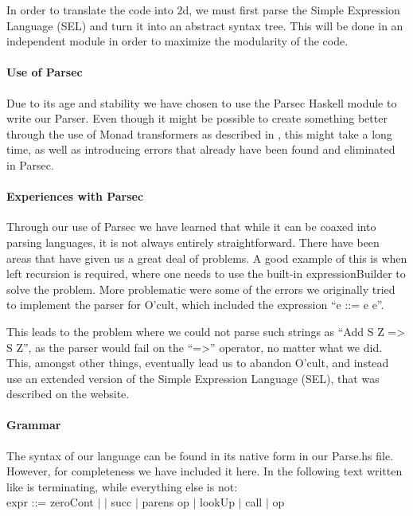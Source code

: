 \label{parser}
In order to translate the code into 2d, we must first parse the Simple
Expression Language (SEL) and turn it into an abstract syntax
tree. This will be done in an independent module in order to maximize
the modularity of the code.

\paragraph{Use of Parsec}
Due to its age and stability we have chosen to use the Parsec Haskell
module to write our Parser. Even though it might be possible to create
something better through the use of Monad transformers as described in
\cite{partial+parsing}, this might take a long time, as well as
introducing errors that already have been found and eliminated in
Parsec.

\paragraph{Experiences with Parsec}
Through our use of Parsec we have learned that while it can be coaxed
into parsing languages, it is not always entirely
straightforward. There have been areas that have given us a great deal
of problems. A good example of this is when left recursion is
required, where one needs to use the built-in expressionBuilder to
solve the problem. More problematic were some of the errors we
originally tried to implement the parser for O'cult, which included
the expression ``e ::= e e''.

This leads to the problem where we could not parse such strings as
``Add S Z => S Z'', as the parser would fail on the ``=>'' operator,
no matter what we did. This, amongst other things, eventually lead us
to abandon O'cult, and instead use an extended version of the Simple
Expression Language (SEL), that was described on the website.


\paragraph{Grammar}
The syntax of our language can be found in its native form in our
Parse.hs file. However, for completeness we have included it here. In
the following text written like  is terminating, while
everything else is not:\\

expr ::= zeroCont $\mid$  $\mid$ succ $\mid$ parens op $\mid$ lookUp $\mid$ call $\mid$ op\\

